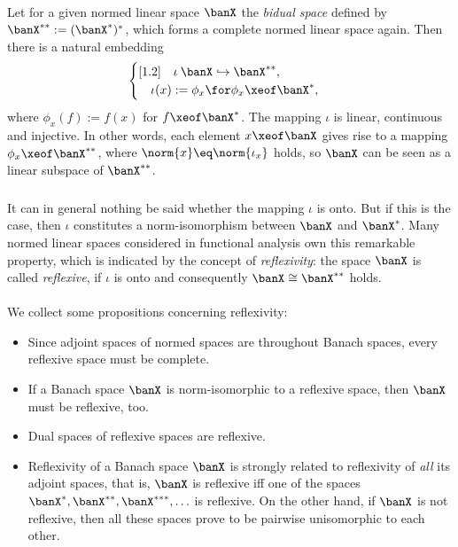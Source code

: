 \documentclass[11pt,twoside]{article}
\begin{document}
\paragraph{} %
Let for a given normed linear space $\banX$ the \textit{bidual space}
defined by $\banX^{**} := (\banX^*)^*$,
which forms a complete normed linear space again.
Then there is a natural embedding
\[
\begin{cases}[1.2]
\quad \iota \: \banX \hookrightarrow \banX^{**},\\
\quad \iota(x) := \phi_x \for \phi_x \xeof \banX^*,\\
\end{cases}
\]
where $\phi_x(f) := f(x)$ for $f \xeof \banX^*$.
The mapping $\iota$ is linear, continuous and injective.
In other words,
each element $x \xeof \banX$ gives rise to a mapping $\phi_x \xeof \banX^{**}$,
where $\norm{x} \eq \norm{\iota_x}$ holds,
so $\banX$ can be seen as a linear subspace of $\banX^{**}$.

\subparagraph{} %
It can in general nothing be said whether the mapping $\iota$ is onto.
But if this is the case,
then $\iota$ constitutes a norm-isomorphism between $\banX$ and $\banX^*$.
Many normed linear spaces considered in functional analysis
own this remarkable property,
which is indicated by the concept of \textit{reflexivity}:
the space $\banX$ is called \textit{reflexive},
if $\iota$ is onto and consequently $\banX \cong \banX^{**}$ holds.

\paragraph{} %
We collect some propositions concerning reflexivity:

\begin{itemize}[leftmargin=12pt,itemsep=5pt]
\item[1.]
Since adjoint spaces of normed spaces are throughout Banach spaces,
every reflexive space must be complete.

\item[2.]
If a Banach space $\banX$ is norm-isomorphic to a reflexive space,
then $\banX$ must be reflexive, too.


\item[3.]
Dual spaces of reflexive spaces are reflexive.

\item[4.]
Reflexivity of a Banach space $\banX$ is strongly related to reflexivity
of \textit{all} its adjoint spaces,
that is,
$\banX$ is reflexive
iff
one of the spaces
$
\banX^{*}, \banX^{**}, \banX^{***}, \ldots
$
is reflexive.
On the other hand,
if $\banX$ is not reflexive,
then all these spaces prove to be pairwise unisomorphic to each other.
\end{itemize}
\end{document}
